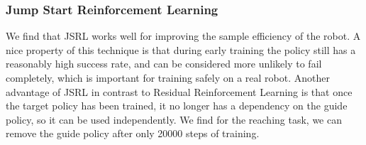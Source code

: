 \documentclass[letterpaper, 10 pt, conference]{ieeeconf}  %
\begin{document}
\subsubsection{Jump Start Reinforcement Learning}

We find that JSRL works well for improving the sample efficiency of the robot. A
nice property of this technique is that during early training the policy still
has a reasonably high success rate, and can be considered more unlikely to fail
completely, which is important for training safely on a real robot. Another
advantage of JSRL in contrast to Residual Reinforcement Learning is that once
the target policy has been trained, it no longer has a dependency on the guide
policy, so it can be used independently. We find for the reaching task,
we can remove the guide policy after only 20000 steps of training.
\end{document}
